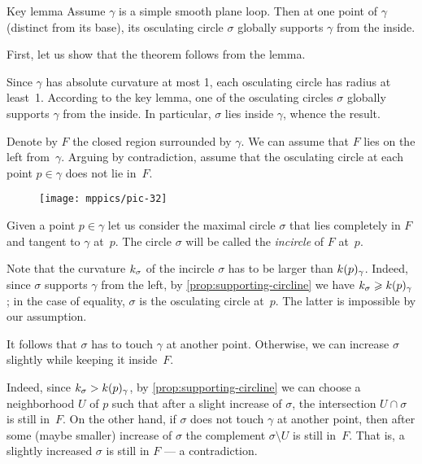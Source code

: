 \begin{thm}{Key lemma}\label{thm:moon}
Assume $\gamma$ is a simple smooth plane loop.
Then at one point of $\gamma$ (distinct from its base), its osculating circle $\sigma$ globally supports $\gamma$ from the inside.
\end{thm}

First, let us show that the theorem follows from the lemma.

Since $\gamma$ has absolute curvature at most 1, each osculating circle has radius at least~1.
According to the key lemma, one of the osculating circles $\sigma$ globally supports $\gamma$ from the inside.
In particular, $\sigma$ lies inside $\gamma$, whence the result.
\qeds

Denote by $F$ the closed region surrounded by $\gamma$.
We can assume that $F$ lies on the left from~$\gamma$.
Arguing by contradiction,
assume that the osculating circle at each point $p\in \gamma$ does not lie in~$F$.

\begin{figure}[!ht]
\vskip-0mm
\centering
\texttt{[image: mppics/pic-32]}
\vskip-2mm
\end{figure}

Given a point $p\in\gamma$ let us consider the maximal circle $\sigma$ that lies completely in $F$ and tangent to $\gamma$ at~$p$.
The circle $\sigma$ will be called the {}\emph{incircle} of $F$ at~$p$.

Note that the curvature $k_\sigma$ of the incircle $\sigma$ has to be larger than $k(p)_\gamma$.
Indeed, since $\sigma$ supports $\gamma$ from the left, by \ref{prop:supporting-circline} we have $k_\sigma\geqslant k(p)_\gamma$; in the case of equality, $\sigma$ is the osculating circle at~$p$.
The latter is impossible by our assumption.

It follows that $\sigma$ has to touch $\gamma$ at another point.
Otherwise, we can increase $\sigma$ slightly while keeping it inside~$F$.

Indeed, since $k_\sigma> k(p)_\gamma$, 
by \ref{prop:supporting-circline} we can choose a neighborhood $U$ of $p$ such that after a slight increase of $\sigma$, the intersection $U\cap \sigma$ is still in~$F$.
On the other hand, if $\sigma$ does not touch $\gamma$ at another point, then after some (maybe smaller) increase of $\sigma$ the complement $\sigma\setminus U$ is still in~$F$.
That is, a slightly increased $\sigma$ is still in $F$ --- a contradiction.



